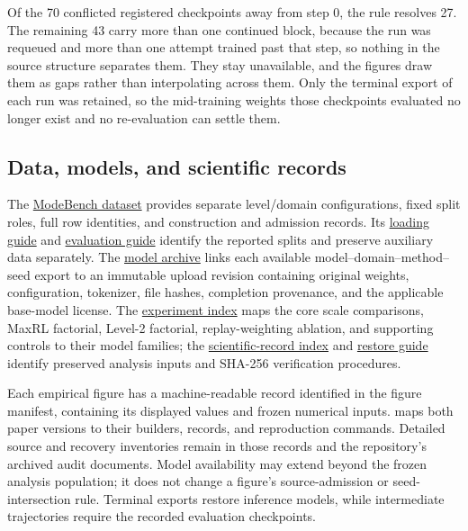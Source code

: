 \documentclass{article}
\newcommand{\1}{\mathbf 1}
\theoremstyle{remark}
\theoremstyle{definition}
\theoremstyle{plain}
\begin{document}
Of the 70 conflicted registered checkpoints away from step 0, the rule resolves
27. The remaining 43 carry more than one continued block, because the run was
requeued and more than one attempt trained past that step, so nothing in the
source structure separates them. They stay unavailable, and the figures draw
them as gaps rather than interpolating across them. Only the terminal export of
each run was retained, so the mid-training weights those checkpoints evaluated
no longer exist and no re-evaluation can settle them.

\subsection{Data, models, and scientific records}
\label{app:repro-artifacts}
\label{app:repro-code}
\label{app:archived-models}

The \href{https://huggingface.co/datasets/od2961/ModeBench}{ModeBench dataset}
provides separate level/domain configurations, fixed split roles, full row
identities, and construction and admission records. Its
\href{https://huggingface.co/datasets/od2961/ModeBench\#loading}{loading guide}
and \href{https://huggingface.co/datasets/od2961/ModeBench\#evaluation}{evaluation guide}
identify the reported splits and preserve auxiliary data separately.
The \href{https://huggingface.co/od2961/maxent-grpo-models}{model archive}
links each available model--domain--method--seed export to an immutable
upload revision containing original weights, configuration, tokenizer,
file hashes, completion provenance, and the applicable base-model license.
The \href{https://huggingface.co/od2961/maxent-grpo-models/blob/main/EXPERIMENTS.md}{experiment index}
maps the core scale comparisons, MaxRL factorial, Level-2 factorial,
replay-weighting ablation, and supporting controls to their model families;
the \href{https://huggingface.co/od2961/maxent-grpo-models/blob/main/DATA.md}{scientific-record index}
and \href{https://huggingface.co/od2961/maxent-grpo-models/blob/main/RESTORE.md}{restore guide}
identify preserved analysis inputs and SHA-256 verification procedures.

Each empirical figure has a machine-readable record identified in the
figure manifest, containing its displayed values and frozen numerical inputs.
 maps both paper versions to their builders,
records, and reproduction commands. Detailed source and recovery inventories
remain in those records and the repository's archived audit documents.
Model availability may extend beyond the frozen analysis population; it
does not change a figure's source-admission or seed-intersection rule.
Terminal exports restore inference models, while intermediate trajectories
require the recorded evaluation checkpoints.
\end{document}
